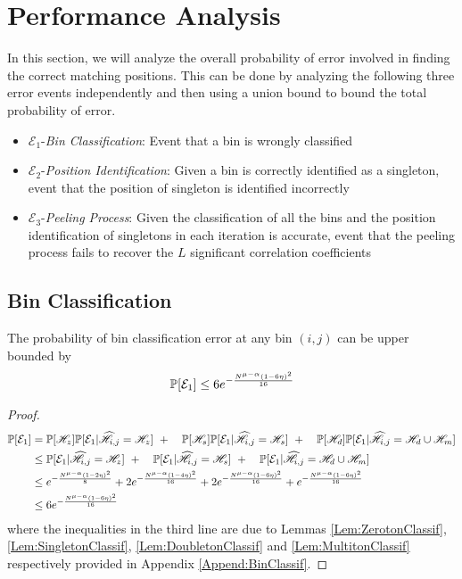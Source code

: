 \section{Performance Analysis}
\def\vgap{2pt}
In this section, we will analyze the overall probability of error involved in finding the correct matching positions. This can be done by analyzing the following three error events independently and then using a union bound to bound the total probability of error.

\begin{itemize}
	\item $\mathcal{E}_1${-\it Bin Classification}: Event that a bin is wrongly classified
	\item $\mathcal{E}_2${-\it Position Identification}: Given a bin is correctly identified as a singleton, event that the position of singleton is identified incorrectly
	\item $\mathcal{E}_3${-\it Peeling Process}: Given the classification of all the bins and the position identification of singletons in each iteration is accurate, event that the peeling process fails to recover the $L$ significant correlation coefficients
\end{itemize}

\subsection{\bf Bin Classification}
\begin{lemma}
The probability of bin classification error at any bin $(i,j)$ can be upper bounded by
\begin{align*}
\mathbb{P}[\mathcal{E}_1]\leq 6e^{-\frac{N^{\mu-\alpha}(1-6\eta)^2}{16}}
\end{align*}
\end{lemma}

\begin{proof}
\begin{align*}
\mathbb{P}[\mathcal{E}_1]&=\mathbb{P}[\mathscr{H}_z]\mathbb{P}[\mathcal{E}_1|\widehat{\mathscr{H}}_{i,j}=\mathscr{H}_z]~+
						\quad \mathbb{P}[\mathscr{H}_s]\mathbb{P}[\mathcal{E}_1|\widehat{\mathscr{H}}_{i,j}=\mathscr{H}_s]~+
						\quad\mathbb{P}[\mathscr{H}_d]\mathbb{P}[\mathcal{E}_1|\widehat{\mathscr{H}}_{i,j}=\mathscr{H}_d \cup \mathscr{H}_m]\\
				&\leq \mathbb{P}[\mathcal{E}_1|\widehat{\mathscr{H}}_{i,j}=\mathscr{H}_z]~+
						\quad \mathbb{P}[\mathcal{E}_1|\widehat{\mathscr{H}}_{i,j}=\mathscr{H}_s]~+
						\quad \mathbb{P}[\mathcal{E}_1|\widehat{\mathscr{H}}_{i,j}=\mathscr{H}_d \cup \mathscr{H}_m]\\
    			&\leq  e^{-\frac{N^{\mu-\alpha}(1-2\eta)^2}{8}}+2e^{-\frac{N^{\mu-\alpha}(1-4\eta)^2}{16}}+ 2e^{-\frac{N^{\mu-\alpha}(1-6\eta)^2}{16}}+e^{-\frac{N^{\mu-\alpha}(1-6\eta)^2}{16}}\\
    			&\leq 6e^{-\frac{N^{\mu-\alpha}(1-6\eta)^2}{16}}\\
						\end{align*}
						where the inequalities in the third line are due to Lemmas \ref{Lem:ZerotonClassif}, \ref{Lem:SingletonClassif}, \ref{Lem:DoubletonClassif} and \ref{Lem:MultitonClassif} respectively provided in Appendix \ref{Append:BinClassif}.
\end{proof}

